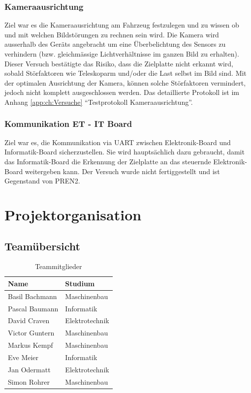 \documentclass[a4paper]{report}
\begin{document}
\subsection{Kameraausrichtung}
\label{ssec:VersKamera}
Ziel war es die Kameraausrichtung am Fahrzeug festzulegen und zu wissen ob und mit welchen Bildstörungen zu rechnen sein wird.
Die Kamera wird ausserhalb des Geräts angebracht um eine Überbelichtung des Sensors zu verhindern (bzw. gleichmässige Lichtverhältnisse im ganzen Bild zu erhalten).
Dieser Versuch bestätigte das Risiko, dass die Zielplatte nicht erkannt wird, sobald Störfaktoren wie Teleskoparm und/oder die Last selbst im Bild sind.  Mit der optimalen Ausrichtung der Kamera, können solche Störfaktoren vermindert, jedoch nicht komplett ausgeschlossen werden. Das detaillierte Protokoll ist im Anhang \ref{app:ch:Versuche}  \textquotedblleft Testprotokoll Kameraausrichtung\textquotedblright.

\subsection{Kommunikation ET - IT Board}
\label{ssec:VersKomm}
Ziel war es, die Kommunikation via UART zwischen Elektronik-Board und Informatik-Board sicherzustellen. Sie wird hauptsächlich dazu gebraucht, damit das Informatik-Board die Erkennung der Zielplatte an das steuernde Elektronik-Board weitergeben kann. Der Versuch wurde nicht fertiggestellt und ist Gegenstand von PREN2.

\chapter{Projektorganisation}
\label{ch:ProjektOrga}

\section{Teamübersicht}
\label{sec:Teamuebersicht}
\begin{table}[h!]
	\centering
	\begin{tabular}{|p{}|p{}|}
		\hline
		\textbf{Name} & \textbf{Studium} \\
		\hline
		Basil Bachmann & Maschinenbau \\
		\hline
		Pascal Baumann & Informatik \\
		\hline
		David Craven & Elektrotechnik \\
		\hline
		Victor Guntern & Maschinenbau \\
		\hline
		Markus Kempf & Maschinenbau \\
		\hline
		Eve Meier & Informatik \\
		\hline
		Jan Odermatt & Elektrotechnik \\
		\hline
		Simon Rohrer & Maschinenbau \\
		\hline
	\end{tabular}
	\caption{Teammitglieder}
	\label{tab:TeamMitglieder}
\end{table}
\end{document}
